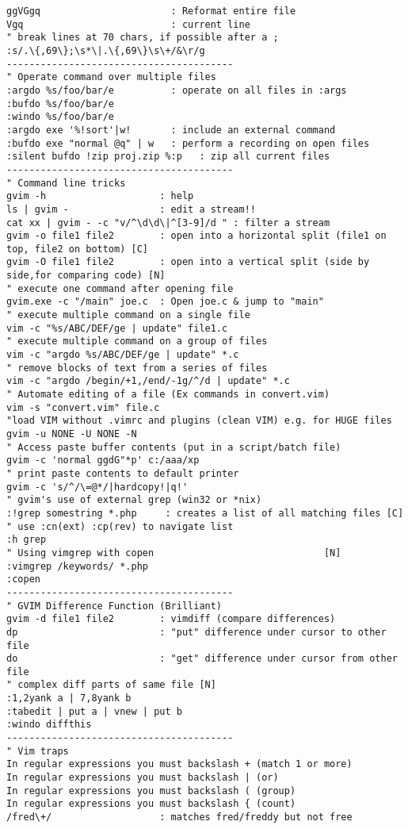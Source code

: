 \documentclass[10pt,landscape]{article}
\begin{document}
\begin{multicols}{2}
\begin{verbatim}
ggVGgq                       : Reformat entire file
Vgq                          : current line
" break lines at 70 chars, if possible after a ;
:s/.\{,69\};\s*\|.\{,69\}\s\+/&\r/g
----------------------------------------
" Operate command over multiple files
:argdo %s/foo/bar/e          : operate on all files in :args
:bufdo %s/foo/bar/e
:windo %s/foo/bar/e
:argdo exe '%!sort'|w!       : include an external command
:bufdo exe "normal @q" | w   : perform a recording on open files
:silent bufdo !zip proj.zip %:p   : zip all current files
----------------------------------------
" Command line tricks
gvim -h                    : help
ls | gvim -                : edit a stream!!
cat xx | gvim - -c "v/^\d\d\|^[3-9]/d " : filter a stream
gvim -o file1 file2        : open into a horizontal split (file1 on top, file2 on bottom) [C]
gvim -O file1 file2        : open into a vertical split (side by side,for comparing code) [N]
" execute one command after opening file
gvim.exe -c "/main" joe.c  : Open joe.c & jump to "main"
" execute multiple command on a single file
vim -c "%s/ABC/DEF/ge | update" file1.c
" execute multiple command on a group of files
vim -c "argdo %s/ABC/DEF/ge | update" *.c
" remove blocks of text from a series of files
vim -c "argdo /begin/+1,/end/-1g/^/d | update" *.c
" Automate editing of a file (Ex commands in convert.vim)
vim -s "convert.vim" file.c
"load VIM without .vimrc and plugins (clean VIM) e.g. for HUGE files
gvim -u NONE -U NONE -N
" Access paste buffer contents (put in a script/batch file)
gvim -c 'normal ggdG"*p' c:/aaa/xp
" print paste contents to default printer
gvim -c 's/^/\=@*/|hardcopy!|q!'
" gvim's use of external grep (win32 or *nix)
:!grep somestring *.php     : creates a list of all matching files [C]
" use :cn(ext) :cp(rev) to navigate list
:h grep
" Using vimgrep with copen                              [N]
:vimgrep /keywords/ *.php
:copen
----------------------------------------
" GVIM Difference Function (Brilliant)
gvim -d file1 file2        : vimdiff (compare differences)
dp                         : "put" difference under cursor to other file
do                         : "get" difference under cursor from other file
" complex diff parts of same file [N]
:1,2yank a | 7,8yank b
:tabedit | put a | vnew | put b
:windo diffthis 
----------------------------------------
" Vim traps
In regular expressions you must backslash + (match 1 or more)
In regular expressions you must backslash | (or)
In regular expressions you must backslash ( (group)
In regular expressions you must backslash { (count)
/fred\+/                   : matches fred/freddy but not free

\end{verbatim}
\end{multicols}
\end{document}
